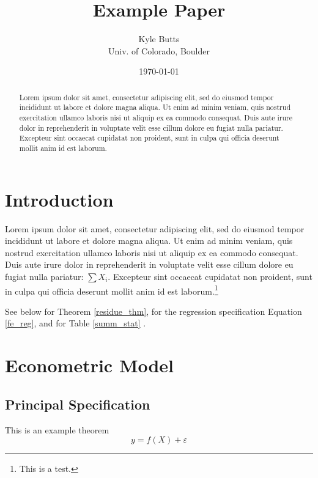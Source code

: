 \documentclass[11pt]{article}
\title{\color{navyblue} Example Paper}
\author{\normalsize Kyle Butts\\{\footnotesize Univ. of Colorado, Boulder}}
\date{\footnotesize\today}
\begin{document}
\maketitle
\begin{abstract}
    Lorem ipsum dolor sit amet, consectetur adipiscing elit, sed do eiusmod tempor incididunt ut labore et dolore magna aliqua. Ut enim ad minim veniam, quis nostrud exercitation ullamco laboris nisi ut aliquip ex ea commodo consequat. Duis aute irure dolor in reprehenderit in voluptate velit esse cillum dolore eu fugiat nulla pariatur. Excepteur sint occaecat cupidatat non proident, sunt in culpa qui officia deserunt mollit anim id est laborum.
\end{abstract}

\newpage

\section{Introduction}

Lorem ipsum dolor sit amet, consectetur adipiscing elit, sed do eiusmod tempor incididunt ut labore et dolore magna aliqua. Ut enim ad minim veniam, quis nostrud exercitation ullamco laboris nisi ut aliquip ex ea commodo consequat. Duis aute irure dolor in reprehenderit in voluptate velit esse cillum dolore eu fugiat nulla pariatur: $\sum X_i$. Excepteur sint occaecat cupidatat non proident, sunt in culpa qui officia deserunt mollit anim id est laborum.\footnote{This is a test.}

See below for Theorem \ref{residue_thm}, for the regression specification Equation \ref{fe_reg}, and for Table \ref{summ_stat} \citep{Eigen1971}. 

\section{Econometric Model}

\subsection{Principal Specification}

\begin{theorem}\label{residue_thm}
    This is an example theorem \[ 
        y = f(X) + \varepsilon 
    \]
\end{theorem}
\end{document}

